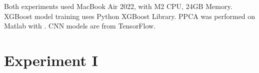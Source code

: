 \documentclass[12pt,a4paper,english
]{tunithesis}
\begin{document}

Both experiments used MacBook Air 2022, with M2 CPU, 24GB Memory. XGBoost model training uses Python XGBoost Library. PPCA was performed on Matlab with \textcite{jakob2015}. CNN models are from TensorFlow.

\section{Experiment I}
\end{document}
